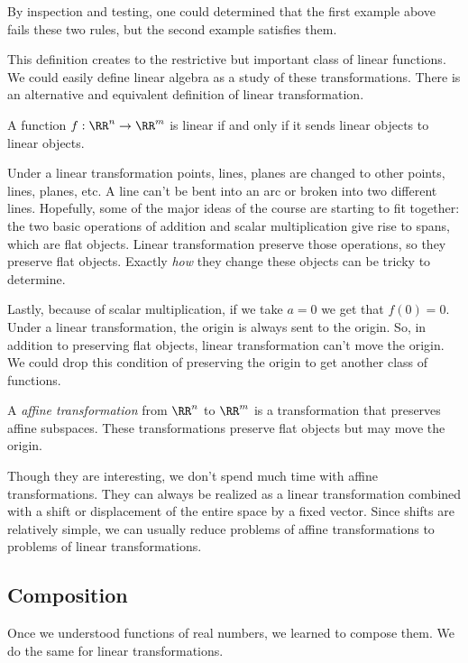 \documentclass[fleqn]{report}
\begin{document}
By inspection and testing, one could determined that the first
example above fails these two rules, but the second example
satisfies them.

This definition creates to the restrictive but important
class of linear functions. We could easily define linear
algebra as a study of these transformations. There is an
alternative and equivalent definition of linear
transformation.

\begin{prop}
A function $f: \RR^n \rightarrow \RR^m$ is linear if and only
if it sends linear objects to linear objects.
\end{prop}

Under a linear transformation points, lines, planes are changed
to other points, lines, planes, etc. A line can't be bent into
an arc or broken into two different lines. Hopefully, some
of the major ideas of the course are starting to fit together:
the two basic operations of addition and scalar multiplication
give rise to spans, which are flat objects. Linear
transformation preserve those operations, so they preserve
flat objects. Exactly \emph{how} they change these objects
can be tricky to determine.

Lastly, because of scalar multiplication, if we take $a
= 0$ we get that $f(0) = 0$. Under a linear transformation,
the origin is always sent to the origin. So, in addition to
preserving flat objects, linear transformation can't move the
origin. We could drop this condition of preserving the origin
to get another class of functions.

\begin{defn}
A \emph{affine transformation} from $\RR^n$ to $\RR^m$ is a
transformation that preserves affine subspaces. These
transformations preserve flat objects but may move the origin. 
\end{defn}

Though they are interesting, we don't spend much time with
affine transformations. They can always be realized as a linear
transformation combined with a shift or displacement of the
entire space by a fixed vector. Since shifts are relatively
simple, we can usually reduce problems of affine
transformations to problems of linear transformations.

\subsection{Composition}
\label{composition}

Once we understood functions of real numbers, we learned to
compose them. We do the same for linear transformations.
\end{document}
